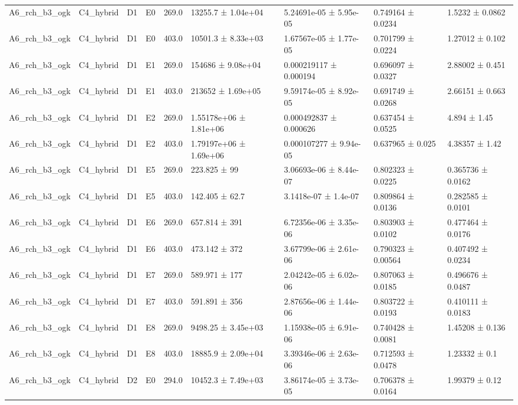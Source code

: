 \begin{table}
\begin{tabular}{lllllllll}
A6\_rch\_b3\_ogk & C4\_hybrid & D1 & E0 & 269.0 & 13255.7 ± 1.04e+04 & 5.24691e-05 ± 5.95e-05 & 0.749164 ± 0.0234 & 1.5232 ± 0.0862 \\
A6\_rch\_b3\_ogk & C4\_hybrid & D1 & E0 & 403.0 & 10501.3 ± 8.33e+03 & 1.67567e-05 ± 1.77e-05 & 0.701799 ± 0.0224 & 1.27012 ± 0.102 \\
A6\_rch\_b3\_ogk & C4\_hybrid & D1 & E1 & 269.0 & 154686 ± 9.08e+04 & 0.000219117 ± 0.000194 & 0.696097 ± 0.0327 & 2.88002 ± 0.451 \\
A6\_rch\_b3\_ogk & C4\_hybrid & D1 & E1 & 403.0 & 213652 ± 1.69e+05 & 9.59174e-05 ± 8.92e-05 & 0.691749 ± 0.0268 & 2.66151 ± 0.663 \\
A6\_rch\_b3\_ogk & C4\_hybrid & D1 & E2 & 269.0 & 1.55178e+06 ± 1.81e+06 & 0.000492837 ± 0.000626 & 0.637454 ± 0.0525 & 4.894 ± 1.45 \\
A6\_rch\_b3\_ogk & C4\_hybrid & D1 & E2 & 403.0 & 1.79197e+06 ± 1.69e+06 & 0.000107277 ± 9.94e-05 & 0.637965 ± 0.025 & 4.38357 ± 1.42 \\
A6\_rch\_b3\_ogk & C4\_hybrid & D1 & E5 & 269.0 & 223.825 ± 99 & 3.06693e-06 ± 8.44e-07 & 0.802323 ± 0.0225 & 0.365736 ± 0.0162 \\
A6\_rch\_b3\_ogk & C4\_hybrid & D1 & E5 & 403.0 & 142.405 ± 62.7 & 3.1418e-07 ± 1.4e-07 & 0.809864 ± 0.0136 & 0.282585 ± 0.0101 \\
A6\_rch\_b3\_ogk & C4\_hybrid & D1 & E6 & 269.0 & 657.814 ± 391 & 6.72356e-06 ± 3.35e-06 & 0.803903 ± 0.0102 & 0.477464 ± 0.0176 \\
A6\_rch\_b3\_ogk & C4\_hybrid & D1 & E6 & 403.0 & 473.142 ± 372 & 3.67799e-06 ± 2.61e-06 & 0.790323 ± 0.00564 & 0.407492 ± 0.0234 \\
A6\_rch\_b3\_ogk & C4\_hybrid & D1 & E7 & 269.0 & 589.971 ± 177 & 2.04242e-05 ± 6.02e-06 & 0.807063 ± 0.0185 & 0.496676 ± 0.0487 \\
A6\_rch\_b3\_ogk & C4\_hybrid & D1 & E7 & 403.0 & 591.891 ± 356 & 2.87656e-06 ± 1.44e-06 & 0.803722 ± 0.0193 & 0.410111 ± 0.0183 \\
A6\_rch\_b3\_ogk & C4\_hybrid & D1 & E8 & 269.0 & 9498.25 ± 3.45e+03 & 1.15938e-05 ± 6.91e-06 & 0.740428 ± 0.0081 & 1.45208 ± 0.136 \\
A6\_rch\_b3\_ogk & C4\_hybrid & D1 & E8 & 403.0 & 18885.9 ± 2.09e+04 & 3.39346e-06 ± 2.63e-06 & 0.712593 ± 0.0478 & 1.23332 ± 0.1 \\
A6\_rch\_b3\_ogk & C4\_hybrid & D2 & E0 & 294.0 & 10452.3 ± 7.49e+03 & 3.86174e-05 ± 3.73e-05 & 0.706378 ± 0.0164 & 1.99379 ± 0.12 \\

\end{tabular}
\end{table}
